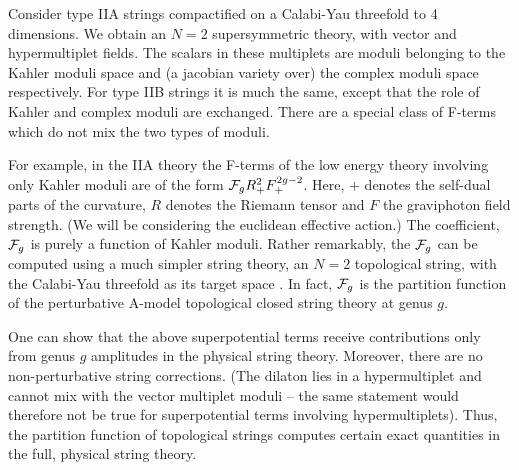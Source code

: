 Consider type IIA strings compactified on a Calabi-Yau
threefold to 4 dimensions. We obtain an $N=2$ supersymmetric
theory, with vector and hypermultiplet fields. The scalars
in these multiplets are moduli belonging to the Kahler moduli space
and (a jacobian variety over) the complex moduli space respectively.
For type IIB strings it is much the same, except that the role of Kahler
and complex moduli are exchanged. There are a special class of
F-terms which do not mix the two types of moduli.

For example, in the IIA theory
the F-terms of the low energy theory
 involving only Kahler moduli are of the form
${\cal F}_g R_+^2 F_+^{2g-2}$. Here, $+$ denotes the self-dual parts of the
curvature, $R$ denotes the Riemann tensor and $F$ the graviphoton
field strength. (We will be considering the euclidean effective action.)
The coefficient, ${\cal F}_g$ is purely a function of Kahler
moduli. Rather remarkably, the ${\cal F}_g$ can be computed
using a much simpler string theory, an $N=2$ topological string,
with the Calabi-Yau threefold as its target space \bcovii \naret .
In fact, ${\cal F}_g$ is the partition function of the perturbative A-model
topological closed string theory at genus $g$.

One can show that the above superpotential terms receive contributions
only from genus $g$ amplitudes in the physical string theory. Moreover,
there are no non-perturbative string corrections.
(The dilaton lies in a hypermultiplet and cannot mix with the vector
multiplet moduli -- the same statement
would therefore not be true for superpotential terms involving
hypermultiplets).
Thus, the partition function of topological strings computes certain
exact quantities in the full, physical string theory.

